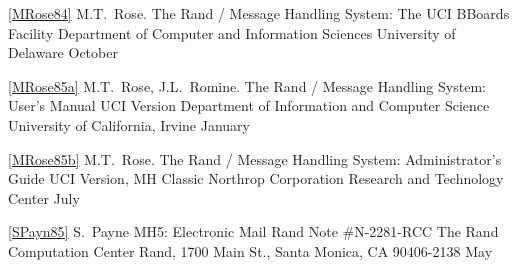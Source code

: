 \let\journalinfo=\jourinfo
\let\thesis=\book			%
\let\thesisinfo=\bookinfo		%


\ref{MRose84}
\by M.T.~Rose.
\paper The Rand \MH/ Message Handling System: The UCI BBoards Facility
\other
\publ Department of Computer and Information Sciences
\publaddr University of Delaware
\month October
\endref

\ref{MRose85a}
\by M.T.~Rose, J.L.~Romine.
\paper The Rand \MH/ Message Handling System: User's Manual
\paperinfo UCI Version
\other
\publ Department of Information and Computer Science
\publaddr University of California, Irvine
\month January
\endref

\ref{MRose85b}
\by M.T.~Rose.
\paper The Rand \MH/ Message Handling System: Administrator's Guide
\paperinfo UCI Version, MH Classic
\other
\publ Northrop Corporation
\publaddr Research and Technology Center
\month July
\endref

\ref{SPayn85}
\by S.~Payne
\paper MH5: Electronic Mail
\paperinfo Rand Note \#N-2281-RCC
\other
\publ The Rand Computation Center
\publaddr Rand, 1700 Main St., Santa Monica, CA  90406-2138
\month May
\endref

\endreferences
